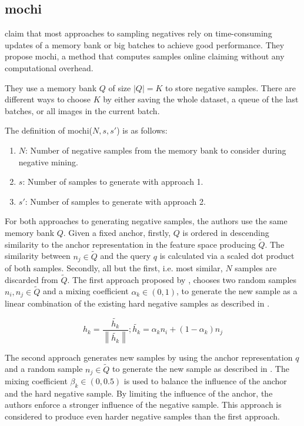 \subsection{\acl{mochi}}\label{subsec:MoCHi}

\citet{mochi_2020} claim that most approaches to sampling negatives rely on 
time-consuming updates of a memory bank or big batches to achieve good performance.
They propose \ac{mochi}, a method that computes samples online claiming without any computational overhead.

They use a memory bank $Q$ of size $| Q | = K$ to store negative samples.
There are different ways to choose $K$ by either saving the whole dataset, a queue of the last batches,
or all images in the current batch.

The definition of \ac{mochi}($N, s, s'$) is as follows:
\begin{enumerate}
    \item $N$: Number of negative samples from the memory bank to consider during negative mining.
    \item $s$: Number of samples to generate with approach 1.
    \item $s'$: Number of samples to generate with approach 2.
\end{enumerate}
For both approaches to generating negative samples, the authors use the same memory bank $Q$.
Given a fixed anchor, firstly, $Q$ is ordered in descending similarity to the anchor representation    
in the feature space producing $\tilde{Q}$.
The similarity between $n_j \in \tilde{Q}$ and the query $q$ is calculated via 
a scaled dot product of both samples.
Secondly, all but the first, i.e. most similar, $N$ samples are discarded from $\tilde{Q}$.
The first approach proposed by \citeauthor{mochi_2020}, chooses two random samples $n_i, n_j \in \tilde{Q}$ 
and a mixing coefficient $\alpha_k \in (0,1)$, 
to generate the new sample as a linear combination of the existing hard negative samples 
as described in .

\begin{equation}
    h_k = \frac{\tilde{h_k}}{\left\| \tilde{h_k}  \right\|}; \tilde{h_k} = \alpha_k n_i + (1-\alpha_k)n_j
    \label{eq:mochi_appr1}
\end{equation}

The second approach generates new samples by using the anchor representation $q$ 
and a random sample $n_j \in \tilde{Q}$ to generate the new sample as described in .
The mixing coefficient $\beta_k \in (0,0.5)$ is used to balance the influence of the anchor 
and the hard negative sample.
By limiting the influence of the anchor, the authors enforce a stronger influence of the negative sample.
This approach is considered to produce even harder negative samples than the first approach.

